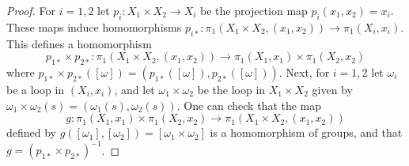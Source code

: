 \documentclass[11pt, letterpaper, oneside]{report}
\theoremstyle{pplain}
\theoremstyle{ddefinition}
\theoremstyle{nnn}
\theoremstyle{eexercise}
\begin{document}
\begin{proof}
For $i=1, 2$ let  $p_{i}\colon X_{1}\times X_{2} \to X_{i}$  be the projection map
$p_{i}(x_{1}, x_{2}) = x_{i}$. These maps induce homomorphisms 
$p_{i\ast}\colon \pi_{1}(X_{1}\times X_{2}, (x_{1}, x_{2})) \to \pi_{1}(X_{i}, x_{i})$. This defines 
a homomorphism 
$$p_{1\ast}\times p_{2\ast}\colon \pi_{1}(X_{1}\times X_{2}, (x_{1}, x_{2})) 
\to \pi_{1}(X_{1}, x_{1})\times \pi_{1}(X_{2}, x_{2})$$
where $p_{1\ast}\times p_{2\ast}([\omega]) = (p_{1\ast}([\omega]), p_{2\ast}([\omega]))$. 
Next, for $i=1, 2$ let  $\omega_{i}$ be a loop in $(X_{i}, x_{i})$, and let  
$\omega_{1}\times \omega_{2}$ be  the loop in $X_{1}\times X_{2}$ 
given by  $\omega_{1}\times \omega_{2}(s) = (\omega_{1}(s), \omega_{2}(s))$. 
One can check that the map 
$$g\colon \pi_{1}(X_{1}, x_{1})\times \pi_{1}(X_{2}, x_{2}) \to \pi_{1}(X_{1}\times X_{2}, (x_{1}, x_{2}))$$
defined by $g([\omega_{1}], [\omega_{2}]) = [\omega_{1}\times \omega_{2}]$ is 
a homomorphism of groups, and that $ g = (p_{1\ast}\times p_{2\ast})^{-1}$. 
\end{proof} 
\end{document}
